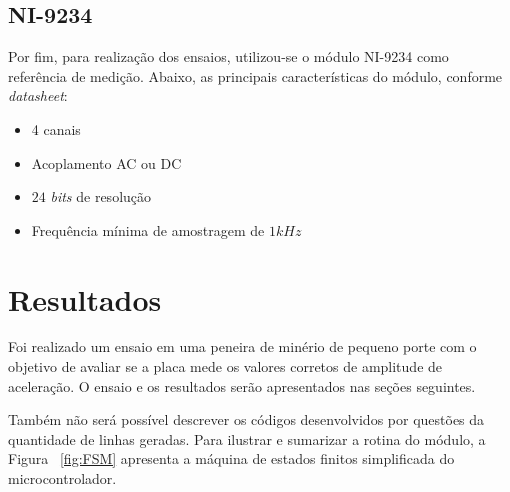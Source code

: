 \documentclass[
	12pt,				%
	openright,			%
	twoside,			%
	a4paper,			%
	english,			%
	french,				%
	spanish,			%
	brazil,				%
	]{abntex2}
\begin{document}
	\section{NI-9234}
		Por fim, para realização dos ensaios, utilizou-se o módulo NI-9234 como referência de medição. Abaixo, as principais características do módulo, conforme \textit{datasheet}\cite{ni9234}:

		\begin{itemize}
			\item 4 canais
			\item Acoplamento AC ou DC
			\item $24$ \textit{bits} de resolução
			\item Frequência mínima de amostragem de $1kHz$
		\end{itemize}

\chapter{Resultados}
	Foi realizado um ensaio em uma peneira de minério de pequeno
	porte com o objetivo de avaliar se a placa mede os valores corretos
	de amplitude de aceleração. O ensaio e os resultados serão
	apresentados nas seções seguintes.

	Também não será possível descrever os códigos desenvolvidos por
	questões da quantidade de linhas geradas. Para ilustrar e sumarizar a rotina do módulo,
	a Figura ~\ref{fig:FSM} apresenta a máquina de estados finitos simplificada do
	microcontrolador.
\end{document}
